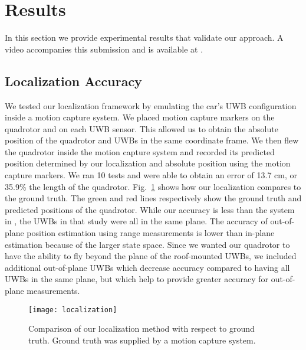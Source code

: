 
\section{Results}

In this section we provide experimental results that validate our approach.  A
video accompanies this submission and is available at \cite{foresight-video}.

\subsection{Localization Accuracy}

We tested our localization framework by emulating the car's UWB configuration inside a motion capture system. We placed motion capture
markers on the quadrotor and on each UWB sensor. This allowed us to
obtain the absolute position of the quadrotor and UWBs in the same coordinate
frame. We then flew the quadrotor inside the motion capture system and recorded
its predicted position determined by our localization and absolute position
using the motion capture markers. We ran 10 tests and were able to obtain an error of
13.7 cm, or 35.9\% the length of the quadrotor. Fig.~\ref{fig:localization}
shows how our localization compares to the ground truth. The green and red
lines respectively show the ground truth and predicted positions of the
quadrotor. While our accuracy is less than the system in \cite{tobiuwb}, the UWBs
in that study were all in the same plane. The accuracy of out-of-plane position estimation
using range measurements is lower than in-plane estimation because of the
larger state space. Since we wanted
our quadrotor to have the ability to fly beyond the plane of the roof-mounted UWBs,
we included additional out-of-plane UWBs which decrease accuracy compared to
having all UWBs in the same plane, but which help to provide greater accuracy for
out-of-plane measurements.



\begin{figure}

    \centering

    \texttt{[image: localization]}

    \caption{Comparison of our localization method with respect to
    ground truth. Ground truth was supplied by a motion capture system.}

    \label{fig:localization}

\end{figure}

